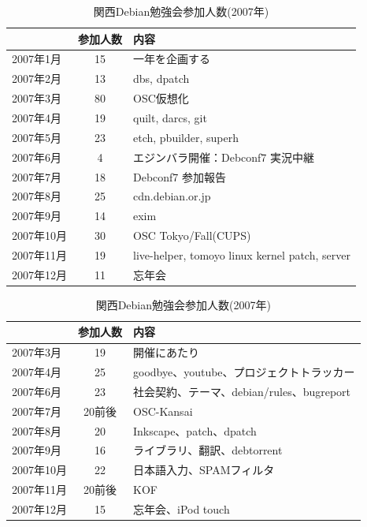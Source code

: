 \documentclass[mingoth,a4paper]{jsarticle}
\begin{document}
\begin{table}[t]
\begin{minipage}{0.5\hsize}
 \caption{東京エリアDebian勉強会参加人数(2007年)}\label{tab:count2007}
 \begin{center}
  \begin{tabular}{|l|c|p{10em}|}
 \hline
 & 参加人数 & 内容\\
 \hline
2007年1月 & 15 & 一年を企画する \\
2007年2月 & 13 & dbs, dpatch\\ 
2007年3月 & 80 & OSC仮想化 \\
2007年4月 & 19 & quilt, darcs, git\\
2007年5月 & 23 & etch, pbuilder, superh \\   
2007年6月 & 4 & エジンバラ開催：Debconf7 実況中継 \\
2007年7月 & 18 & Debconf7 参加報告\\
2007年8月 & 25 & cdn.debian.or.jp \\   
2007年9月 & 14 & exim \\   
2007年10月 & 30 & OSC Tokyo/Fall(CUPS) \\   
2007年11月 & 19 & live-helper, tomoyo linux kernel patch, server\\
2007年12月 & 11 & 忘年会\\
 \hline
  \end{tabular}
 \end{center}
\end{minipage}
\begin{minipage}{0.5\hsize}
 \caption{関西Debian勉強会参加人数(2007年)}\label{tab:count2007kansai}
 \begin{center}
  \begin{tabular}{|l|c|p{10em}|}
 \hline
 & 参加人数 & 内容 \\
 \hline
2007年3月 & 19 & 開催にあたり \\
2007年4月 & 25 & goodbye、youtube、プロジェクトトラッカー\\
2007年6月 & 23 & 社会契約、テーマ、debian/rules、bugreport\\
2007年7月 & 20前後 & OSC-Kansai \\
2007年8月 & 20 & Inkscape、patch、dpatch\\
2007年9月 & 16 & ライブラリ、翻訳、debtorrent\\
2007年10月 & 22& 日本語入力、SPAMフィルタ\\
2007年11月 & 20前後 & KOF \\   
2007年12月 & 15& 忘年会、iPod touch\\   
 \hline
  \end{tabular}
 \end{center}
\end{minipage}
\end{table}
\end{document}
